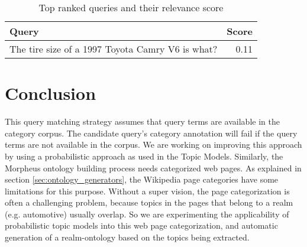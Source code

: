 \begin{table}[h]\footnotesize

\begin{tabular}{l | r}
Query & Score\\
\hline
The tire size of a 1997 Toyota Camry V6 is what? & 0.11\\ 
\hline
\end{tabular}        

\caption{Top ranked queries and their relevance score}
\label{tbl:ranked_queries}   

\end{table}


\section{Conclusion}
This query matching strategy assumes that query terms are available in the
category corpus. The candidate query's category annotation will fail if the
query terms are not available in the corpus. We are working on improving this
approach by using a probabilistic approach as used in the Topic
Models\cite{Blei2003latentdirichlet}. Similarly, the Morpheus ontology building
process needs categorized web pages. As explained in section
\ref{sec:ontology_generators}, the Wikipedia page categories have some
limitations for this purpose. Without a super vision, the page categorization is
often a challenging problem, because topics in the pages that belong to a realm
(e.g. automotive) usually overlap. So we are experimenting the applicability of
probabilistic topic models into this web page categorization, and automatic
generation of a realm-ontology based on the topics being extracted.            
 


